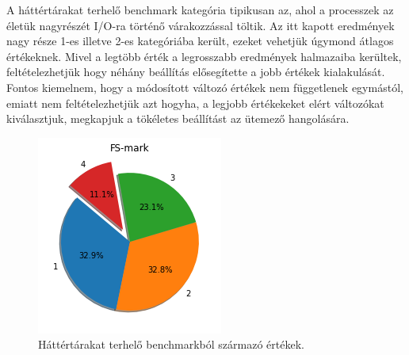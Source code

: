 A háttértárakat terhelő benchmark kategória tipikusan az, ahol a processzek az életük nagyrészét I/O-ra történő várakozzással töltik.
Az itt kapott eredmények nagy része 1-es illetve 2-es kategóriába került, ezeket vehetjük úgymond átlagos értékeknek. Mivel a legtöbb érték a legrosszabb eredmények halmazaiba kerültek, feltételezhetjük hogy néhány beállítás elősegítette a jobb értékek kialakulását. 
Fontos kiemelnem, hogy a módosított változó értékek nem függetlenek egymástól, emiatt nem feltételezhetjük azt hogyha, a legjobb értékekeket elért változókat kiválasztjuk, megkapjuk a tökéletes beállítást az ütemező hangolására.

\begin{figure}[h!]
\centering
\includegraphics[scale=0.6]{images/diskBenchmarkValue.png}
\caption{Háttértárakat terhelő benchmarkból származó értékek.}
\label{fig:diskChart}
\end{figure}


